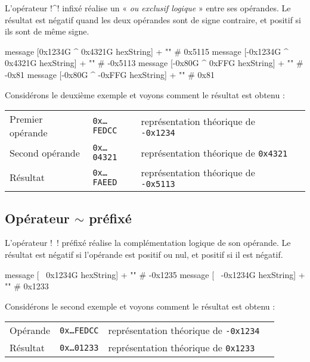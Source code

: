 L'opérateur \ggs!^! infixé réalise un « \emph{ou exclusif logique} » entre ses opérandes. Le résultat est négatif quand les deux opérandes sont de signe contraire, et positif si ils sont de même signe.

\begin{galgas}
message [0x1234G ^ 0x4321G hexString] + "\n" # 0x5115
message [-0x1234G ^ 0x4321G hexString] + "\n" # -0x5113
message [-0x80G ^ 0xFFG hexString] + "\n" # -0x81
message [-0x80G ^ -0xFFG hexString] + "\n" # 0x81
\end{galgas}

Considérons le deuxième exemple et voyons comment le résultat est obtenu :

\begin{tabular}{llll}
Premier opérande & \texttt{0x…FEDCC} & représentation théorique de \texttt{-0x1234}\\
Second opérande  & \texttt{0x…04321} & représentation théorique de \texttt{0x4321} \\
Résultat & \texttt{0x…FAEED} & représentation théorique de \texttt{-0x5113} \\
\end{tabular}


\subsection{Opérateur $\sim$ préfixé}

L'opérateur \ggs!~! préfixé réalise la complémentation logique de son opérande. Le résultat est négatif si l'opérande est positif ou nul, et positif si il est négatif.

\begin{galgas}
message [~  0x1234G hexString] + "\n" # -0x1235
message [~ -0x1234G hexString] + "\n" # 0x1233
\end{galgas}

Considérons le second exemple et voyons comment le résultat est obtenu :

\begin{tabular}{llll}
Opérande & \texttt{0x…FEDCC} & représentation théorique de \texttt{-0x1234}\\
Résultat & \texttt{0x…01233} & représentation théorique de \texttt{0x1233} \\
\end{tabular}











